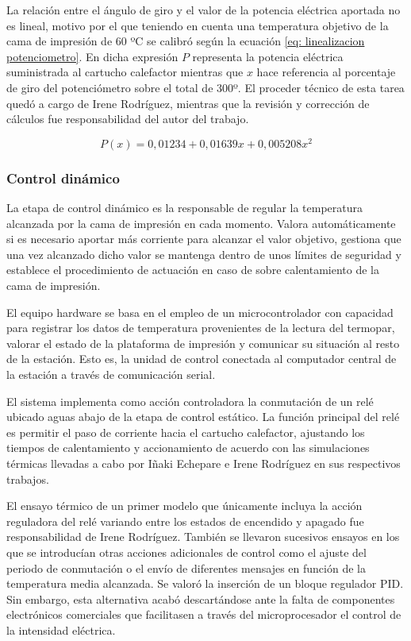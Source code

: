 La relación entre el ángulo de giro y el valor de la potencia eléctrica aportada no es lineal, motivo por el que teniendo en cuenta una temperatura objetivo de la cama de impresión de 60 ºC se calibró según la ecuación \ref{eq: linealizacion potenciometro}. En dicha expresión $P$ representa la potencia eléctrica suministrada al cartucho calefactor mientras que $x$ hace referencia al porcentaje de giro del potenciómetro sobre el total de 300º. El proceder técnico de esta tarea quedó a cargo de Irene Rodríguez, mientras que la revisión y corrección de cálculos fue responsabilidad del autor del trabajo.

\begin{equation}
\label{eq: linealizacion potenciometro}
    P(x)= 0,01234 + 0,01639x + 0,005208x^2
\end{equation}

\subsubsection*{Control dinámico}
\hypertarget{Control dinámico}{}

La etapa de control dinámico es la responsable de regular la temperatura alcanzada por la cama de impresión en cada momento. Valora automáticamente si es necesario aportar más corriente para alcanzar el valor objetivo, gestiona que una vez alcanzado dicho valor se mantenga dentro de unos límites de seguridad y establece el procedimiento de actuación en caso de sobre calentamiento de la cama de impresión.

El equipo hardware se basa en el empleo de un microcontrolador con capacidad para registrar los datos de temperatura provenientes de la lectura del termopar, valorar el estado de la plataforma de impresión y comunicar su situación al resto de la estación. Esto es, la unidad de control conectada al computador central de la estación a través de comunicación serial.

El sistema implementa como acción controladora la conmutación de un relé ubicado aguas abajo de la etapa de control estático. La función principal del relé es permitir el paso de corriente hacia el cartucho calefactor, ajustando los tiempos de calentamiento y accionamiento de acuerdo con las simulaciones térmicas llevadas a cabo por Iñaki Echepare e Irene Rodríguez en sus respectivos trabajos. 

El ensayo térmico de un primer modelo que únicamente incluya la acción reguladora del relé variando entre los estados de encendido y apagado fue responsabilidad de Irene Rodríguez. También se llevaron sucesivos ensayos en los que se introducían otras acciones adicionales de control como el ajuste del periodo de conmutación o el envío de diferentes mensajes en función de la temperatura media alcanzada. Se valoró la inserción de un bloque regulador PID. Sin embargo, esta alternativa acabó descartándose ante la falta de componentes electrónicos comerciales que facilitasen a través del microprocesador el control de la intensidad eléctrica.

